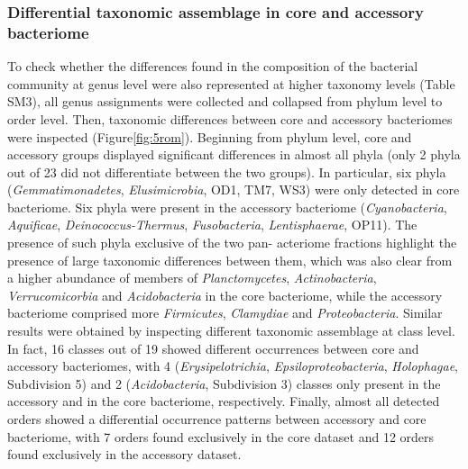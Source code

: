 \subsubsection{Differential taxonomic assemblage in core and accessory bacteriome}
To check whether the differences found in the composition of the bacterial community at genus level were also represented at higher taxonomy levels (Table SM3), all genus assignments were collected and collapsed from phylum level to order level. Then, taxonomic differences between core and accessory bacteriomes were inspected (Figure\ref{fig:5rom}). Beginning from phylum level, core and accessory groups displayed significant differences in almost all phyla (only 2 phyla out of 23 did not differentiate between the two groups). In particular, six phyla (\textit{Gemmatimonadetes}, \textit{Elusimicrobia}, OD1, TM7, WS3) were only detected in core bacteriome. Six phyla were present in the accessory bacteriome (\textit{Cyano\-bacteria}, \textit{Aquificae}, \textit{Deino\-coc\-cus\--Ther\-mus}, \textit{Fuso\-bacte\-ria}, \textit{Lenti\-sphaerae}, OP11). The presence of such phyla exclusive of the two pan- acteriome fractions highlight the presence of large taxonomic differences between them, which was also clear from a higher abundance of members of \textit{Plancto\-mycetes}, \textit{Actino\-bacteria}, \textit{Verruco\-micorbia} and \textit{Acido\-bacteria} in the core bacteriome, while the accessory bacteriome comprised more \textit{Firmicu\-tes}, \textit{Clamy\-diae} and \textit{Proteo\-bacteria}. Similar results were obtained by inspecting different taxonomic assemblage at class level. In fact, 16 classes out of 19 showed different occurrences between core and accessory bacteriomes, with 4 (\textit{Erysi\-pelotri\-chia}, \textit{Epsilo\-proteo\-bacteria}, \textit{Holo\-phagae}, Subdivision 5) and 2 (\textit{Acido\-bacteria}, Subdivision 3) classes only present in the accessory and in the core bacteriome, respectively. Finally, almost all detected orders showed a differential occurrence patterns between accessory and core bacteriome, with 7 orders found exclusively in the core dataset and 12 orders found exclusively in the accessory dataset.\\

